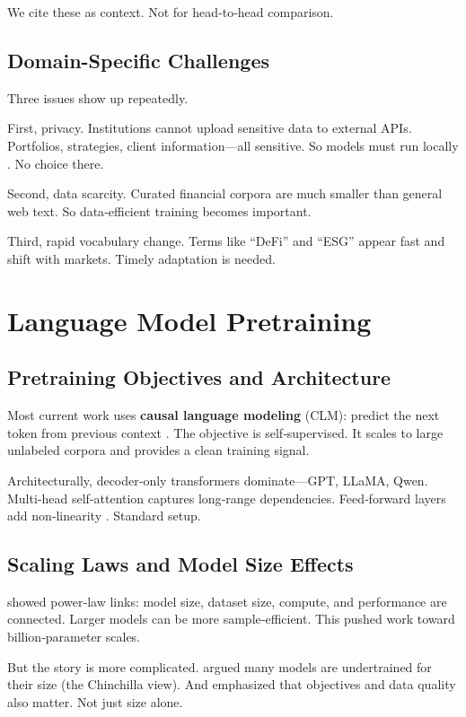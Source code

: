 We cite these as context. Not for head‑to‑head comparison.

\subsection{Domain-Specific Challenges}

Three issues show up repeatedly.

First, privacy. Institutions cannot upload sensitive data to external APIs. Portfolios, strategies, client information—all sensitive. So models must run locally \parencite{wu2023bloomberggpt}. No choice there.

Second, data scarcity. Curated financial corpora are much smaller than general web text. So data‑efficient training becomes important.

Third, rapid vocabulary change. Terms like ``DeFi'' and ``ESG'' appear fast and shift with markets. Timely adaptation is needed.

\section{Language Model Pretraining}

\subsection{Pretraining Objectives and Architecture}

Most current work uses \textbf{causal language modeling} (CLM): predict the next token from previous context \parencite{radford2019language, brown2020language}. The objective is self‑supervised. It scales to large unlabeled corpora and provides a clean training signal.

Architecturally, decoder‑only transformers dominate—GPT, LLaMA, Qwen. Multi‑head self‑attention captures long‑range dependencies. Feed‑forward layers add non‑linearity \parencite{vaswani2017attention, touvron2023llama}. Standard setup.

\subsection{Scaling Laws and Model Size Effects}

\textcite{kaplan2020scaling} showed power‑law links: model size, dataset size, compute, and performance are connected. Larger models can be more sample‑efficient. This pushed work toward billion‑parameter scales.

But the story is more complicated. \textcite{hoffmann2022training} argued many models are undertrained for their size (the Chinchilla view). And \textcite{tay2022ul2} emphasized that objectives and data quality also matter. Not just size alone.


